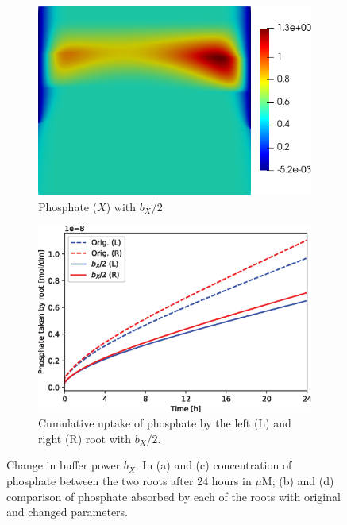 \documentclass[11pt]{article}
\numberwithin{equation}{section}
\begin{document}
\begin{figure}[!htb]
\begin{subfigure}[t]{0.35\textwidth}
    \includegraphics[width=\textwidth]{Figures/X_bXdivby2.png}
    \caption{Phosphate ($X$) with $b_X / 2$}
    \label{fig:numexp_bxdown1}
\end{subfigure}
\hspace{1cm}
\begin{subfigure}[t]{0.4\textwidth}
    \includegraphics[width=\textwidth]{Figures/bxdivby2.eps}
    \caption{Cumulative uptake of phosphate by the left (L) and right (R) root with $b_X / 2$.}
    \label{fig:numexp_bxdown2}
\end{subfigure}
\caption{Change in buffer power $b_X$. In (a) and (c) concentration of phosphate between the two roots after 24 hours in $\mu$M; (b) and (d) comparison of phosphate absorbed by each of the roots with original and changed parameters.}
\end{figure}
\end{document}
